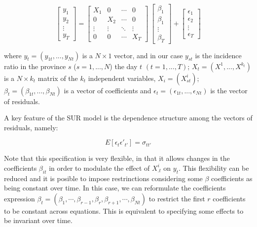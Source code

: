 \documentclass[]{elsarticle} %
\begin{document}
\begin{equation}
\label{eq:sur-sim}
\begin{bmatrix}
y_1 \\ y_2 \\ \vdots \\ y_T
\end{bmatrix}
=
  \begin{bmatrix}
X_1 & 0 & \cdots & 0 \\ 0 & X_2 & \cdots & 0 \\ \vdots & \vdots & \ddots & \vdots \\ 0 & 0 & \cdots & X_T
\end{bmatrix}
\
\begin{bmatrix}
\beta_1 \\ \beta_1 \\ \vdots \\ \beta_T
\end{bmatrix}
+
\begin{bmatrix}
\epsilon_1 \\ \epsilon_2 \\ \vdots \\ \epsilon_T
\end{bmatrix}
\end{equation}

\noindent where \(y_{t}=(y_{1t},...,y_{Nt})\) is a \(N \times 1\)
vector, and in our case \(y_{st}\) is the incidence ratio in the
province \(s\) (\(s=1,...,N\)) the day \(t\) \((t=1,...,T)\);
\(X_t=(X^1,...,X^{k_t})\) is a \(N \times k_t\) matrix of the \(k_t\)
independent variables, \(X_i=(X^i_{st})\);
\(\beta_t=(\beta_{1t},...,\beta_{Nt})\) is a vector of coefficients and
\(\epsilon_t=(\epsilon_{1t},...,\epsilon_{Nt})\) is the vector of
residuals.

A key feature of the SUR model is the dependence structure among the
vectors of residuals, namely:

\begin{equation}
\label{eq:sur-err}
E[\epsilon_t \epsilon'_{t'}]=\sigma_{tt'}
\end{equation}

Note that this specification is very flexible, in that it allows changes
in the coefficients \(\beta_{it}\) in order to modulate the effect of
\(X^i_{.t}\) on \(y_t\). This flexibility can be reduced and it is
posible to impose restrinctions considering some \(\beta\) coefficients
as being constant over time. In this case, we can reformulate the
coefficients expression
\(\beta_t = (\beta_{1}, \cdots, \beta_{r-1}, \beta_{r}, \beta_{r+1}, \cdots, \beta_{Nt})\)
to restrict the first \(r\) coefficients to be constant across
equations. This is equivalent to specifying some effects to be invariant
over time.
\end{document}
